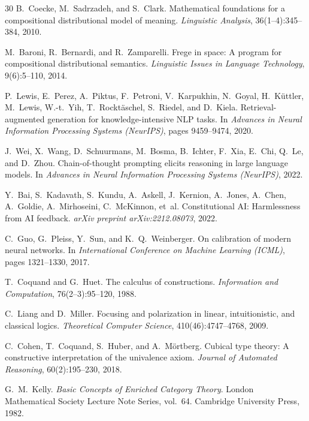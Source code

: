 \documentclass[11pt,a4paper]{article}
\theoremstyle{plain}
\theoremstyle{definition}
\theoremstyle{remark}
\begin{document}
\begin{thebibliography}{30}
B.~Coecke, M.~Sadrzadeh, and S.~Clark.
\newblock Mathematical foundations for a compositional distributional model of meaning.
\newblock \emph{Linguistic Analysis}, 36(1--4):345--384, 2010.

M.~Baroni, R.~Bernardi, and R.~Zamparelli.
\newblock Frege in space: A program for compositional distributional semantics.
\newblock \emph{Linguistic Issues in Language Technology}, 9(6):5--110, 2014.

P.~Lewis, E.~Perez, A.~Piktus, F.~Petroni, V.~Karpukhin, N.~Goyal, H.~K\"{u}ttler, M.~Lewis, W.-t.~Yih, T.~Rockt\"{a}schel, S.~Riedel, and D.~Kiela.
\newblock Retrieval-augmented generation for knowledge-intensive NLP tasks.
\newblock In \emph{Advances in Neural Information Processing Systems (NeurIPS)}, pages 9459--9474, 2020.

J.~Wei, X.~Wang, D.~Schuurmans, M.~Bosma, B.~Ichter, F.~Xia, E.~Chi, Q.~Le, and D.~Zhou.
\newblock Chain-of-thought prompting elicits reasoning in large language models.
\newblock In \emph{Advances in Neural Information Processing Systems (NeurIPS)}, 2022.

Y.~Bai, S.~Kadavath, S.~Kundu, A.~Askell, J.~Kernion, A.~Jones, A.~Chen, A.~Goldie, A.~Mirhoseini, C.~McKinnon, et~al.
\newblock Constitutional AI: Harmlessness from AI feedback.
\newblock \emph{arXiv preprint arXiv:2212.08073}, 2022.

C.~Guo, G.~Pleiss, Y.~Sun, and K.~Q.~Weinberger.
\newblock On calibration of modern neural networks.
\newblock In \emph{International Conference on Machine Learning (ICML)}, pages 1321--1330, 2017.

T.~Coquand and G.~Huet.
\newblock The calculus of constructions.
\newblock \emph{Information and Computation}, 76(2--3):95--120, 1988.

C.~Liang and D.~Miller.
\newblock Focusing and polarization in linear, intuitionistic, and classical logics.
\newblock \emph{Theoretical Computer Science}, 410(46):4747--4768, 2009.

C.~Cohen, T.~Coquand, S.~Huber, and A.~M\"{o}rtberg.
\newblock Cubical type theory: A constructive interpretation of the univalence axiom.
\newblock \emph{Journal of Automated Reasoning}, 60(2):195--230, 2018.

G.~M.~Kelly.
\newblock \emph{Basic Concepts of Enriched Category Theory}.
\newblock London Mathematical Society Lecture Note Series, vol.~64. Cambridge University Press, 1982.


\end{thebibliography}
\end{document}
